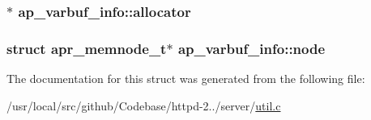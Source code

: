\subsubsection[{\texorpdfstring{allocator}{allocator}}]{$\ast$ ap\+\_\+varbuf\+\_\+info\+::allocator}\hypertarget{structap__varbuf__info_a2d4ea1c7515d4bec18877a805d8d61f7}{}\label{structap__varbuf__info_a2d4ea1c7515d4bec18877a805d8d61f7}
\subsubsection[{\texorpdfstring{node}{node}}]{\setlength{\rightskip}{0pt plus 5cm}struct {\bf apr\+\_\+memnode\+\_\+t}$\ast$ ap\+\_\+varbuf\+\_\+info\+::node}\hypertarget{structap__varbuf__info_aaf9d76ec2d49e5887f3e3d8b1b238086}{}\label{structap__varbuf__info_aaf9d76ec2d49e5887f3e3d8b1b238086}


The documentation for this struct was generated from the following file\+:\begin{DoxyCompactItemize}
\item 
/usr/local/src/github/\+Codebase/httpd-\/2../server/\hyperlink{server_2util_8c}{util.\+c}\end{DoxyCompactItemize}
